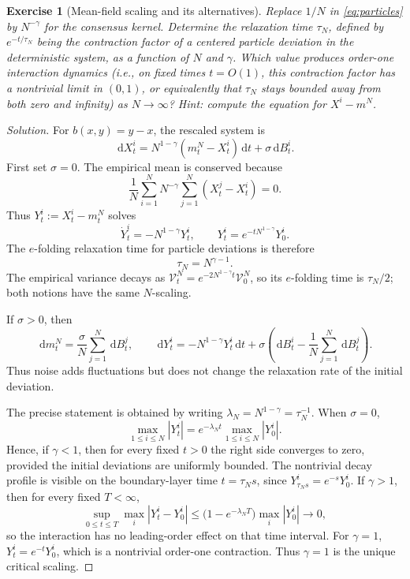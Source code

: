 \documentclass[11pt]{amsart}
\numberwithin{equation}{section}
\theoremstyle{plain}
\newtheorem{exercise}[theorem]{Exercise}
\newcommand{\dd}{\,\mathrm{d}}
\newcommand{\abs}[1]{\left\lvert#1\right\rvert}
\begin{document}
\begin{exercise}[Mean-field scaling and its alternatives]
Replace $1/N$ in \eqref{eq:particles} by $N^{-\gamma}$ for the consensus
kernel.  Determine the relaxation time $\tau_N$, defined by
$e^{-t/\tau_N}$ being the contraction factor of a centered particle
deviation in the deterministic system, as a function of $N$ and $\gamma$.
Which value produces order-one interaction dynamics (i.e., on
fixed times $t=O(1)$, this contraction factor has a nontrivial limit in
$(0,1)$, or equivalently that $\tau_N$ stays bounded away from both zero and
infinity) as $N\to\infty$?
\emph{Hint:} compute the equation for $X^i-m^N$.
\end{exercise}
\begin{proof}[Solution]
For $b(x,y)=y-x$, the rescaled system is
\begin{equation}\label{eq:scaled-consensus}
 \dd X_t^i=N^{1-\gamma}(m_t^N-X_t^i)\dd t+\sigma\dd B_t^i.
\end{equation}
First set $\sigma=0$.  The empirical mean is conserved because
\[
 \frac1N\sum_{i=1}^N N^{-\gamma}
       \sum_{j=1}^N(X_t^j-X_t^i)=0.
\]
Thus $Y_t^i:=X_t^i-m_t^N$ solves
\[
 \dot Y_t^i=-N^{1-\gamma}Y_t^i,
 \qquad
 Y_t^i=e^{-t N^{1-\gamma}}Y_0^i.
\]
The $e$-folding relaxation time for particle deviations is therefore
\begin{equation}\label{eq:relaxation-time}
 \tau_N=N^{\gamma-1}.
\end{equation}
The empirical variance decays as
$\mathcal V_t^N=e^{-2N^{1-\gamma}t}\mathcal V_0^N$, so its $e$-folding time is
$\tau_N/2$; both notions have the same $N$-scaling.

If $\sigma>0$, then
\[
 \dd m_t^N=\frac{\sigma}{N}\sum_{j=1}^N\dd B_t^j,
 \qquad
 \dd Y_t^i=-N^{1-\gamma}Y_t^i\dd t
 +\sigma\left(\dd B_t^i-\frac1N\sum_{j=1}^N\dd B_t^j\right).
\]
Thus noise adds fluctuations but does not change the relaxation rate of the
initial deviation. 

The precise statement is obtained by writing
$\lambda_N=N^{1-\gamma}=\tau_N^{-1}$.  When $\sigma=0$,
\[
 \max_{1\leq i\leq N}\abs{Y_t^i}
 =e^{-\lambda_Nt}\max_{1\leq i\leq N}\abs{Y_0^i}.
\]
Hence, if $\gamma<1$, then for every fixed $t>0$ the right side converges to
zero, provided the initial deviations are uniformly bounded.  The nontrivial
decay profile is visible on the boundary-layer time $t=\tau_Ns$, since
$Y_{\tau_Ns}^i=e^{-s}Y_0^i$.  If $\gamma>1$, then for every fixed $T<\infty$,
\[
 \sup_{0\leq t\leq T}\max_i\abs{Y_t^i-Y_0^i}
 \leq\bigl(1-e^{-\lambda_NT}\bigr)\max_i\abs{Y_0^i}
 \longrightarrow0,
\]
so the interaction has no leading-order effect on that time interval.  For
$\gamma=1$, $Y_t^i=e^{-t}Y_0^i$, which is a nontrivial order-one contraction.
Thus $\boxed{\gamma=1}$ is the unique critical scaling.


\end{proof}
\end{document}
